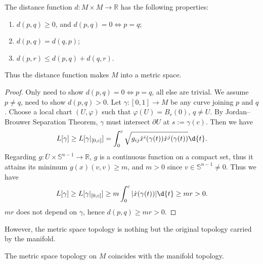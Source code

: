 \begin{prop}
    The distance function $d:M\times M\to\mathbb{R}$ has the following properties:
    \begin{enumerate}[(1)]
        \item $d(p,q)\geq 0$, and $d(p,q)=0\iff p=q$;
        \item $d(p,q)=d(q,p)$;
        \item $d(p,r)\leq d(p,q)+d(q,r)$.
    \end{enumerate}
    Thus the distance function makes $M$ into a metric space.
\end{prop}
\begin{proof}
    Only need to show $d(p,q)=0\iff p=q$, all else are trivial.
    We assume $p\neq q$, need to show $d(p,q)>0$.
    Let $\gamma:[0,1]\to M$ be any curve joining $p$ and $q$.
    Choose a local chart $(U,\varphi)$ such that $\varphi(U)=B_r(0)$, $q\neq U$.
    By Jordan--Brouwer Separation Theorem, $\gamma$ must intersect $\partial U$ at $s:=\gamma(c)$.
    Then we have
    \[L[\gamma]\geq L[\gamma|_{[0,c]}]=\int_0^c\sqrt{g_{ij}\dot{x}^i(\gamma(t))\dot{x}^j(\gamma(t))}\d{t}.\]
    Regarding $g:\overline{U}\times\mathbb{S}^{n-1}\to\mathbb{R}$, $g$ is a continuous function on a compact set, thus it attains its minimum $g(x)(v,v)\geq m$, and $m>0$ since $v\in\mathbb{S}^{n-1}\neq 0$.
    Thus we have
    \begin{equation}
        L[\gamma]\geq L[\gamma|_{[0,c]}]\geq m\int_0^c|\dot{x}(\gamma(t))|\d{t}\geq mr>0.\label{estm of dist}
    \end{equation}
    $mr$ does not depend on $\gamma$, hence $d(p,q)\geq mr>0$.
\end{proof}

However, the metric space topology is nothing but the original topology carried by the manifold.

\begin{prop}\label{metric and manifold topology}
    The metric space topology on $M$ coincides with the manifold topology.
\end{prop}

